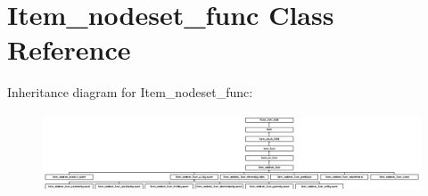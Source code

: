 \hypertarget{classItem__nodeset__func}{}\section{Item\+\_\+nodeset\+\_\+func Class Reference}
\label{classItem__nodeset__func}
Inheritance diagram for Item\+\_\+nodeset\+\_\+func\+:\begin{figure}[H]
\begin{center}
\leavevmode
\includegraphics[height=2.323651cm]{classItem__nodeset__func}
\end{center}
\end{figure}
